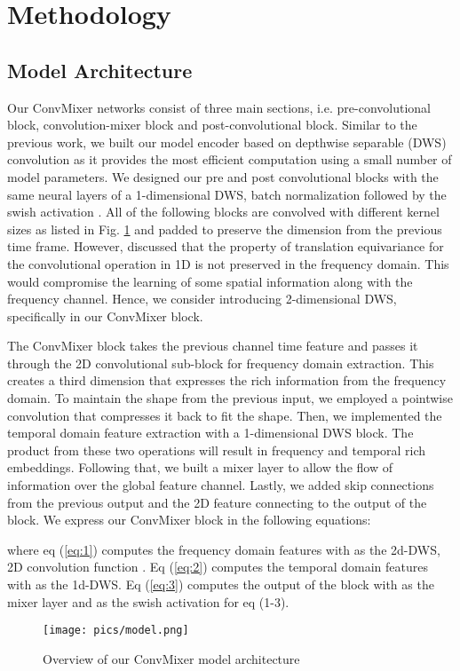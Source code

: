 \documentclass{article}
\begin{document}
\section{Methodology}
\label{sec:method}
\subsection{Model Architecture}
\label{ssec:model}
Our ConvMixer networks consist of three main sections, i.e. pre-convolutional block, convolution-mixer block and post-convolutional block. Similar to the previous work, we built our model encoder based on depthwise separable (DWS) convolution as it provides the most efficient computation using a small number of model parameters. We designed our pre and post convolutional blocks with the same neural layers of a 1-dimensional DWS, batch normalization followed by the swish activation \cite{ramachandran2017searching}. All of the following blocks are convolved with different kernel sizes as listed in Fig. \ref{fig:model} and padded to preserve the dimension from the previous time frame. However, \cite{kim2021broadcasted} discussed that the property of translation equivariance for the convolutional operation in 1D is not preserved in the frequency domain. This would compromise the learning of some spatial information along with the frequency channel. Hence, we consider introducing 2-dimensional DWS, specifically in our ConvMixer block. 

The ConvMixer block takes the previous channel  time feature and passes it through the 2D convolutional sub-block for frequency domain extraction. This creates a third dimension that expresses the rich information from the frequency domain. To maintain the shape from the previous input, we employed a pointwise convolution that compresses it back to fit the shape. Then, we implemented the temporal domain feature extraction with a 1-dimensional DWS block. The product from these two operations will result in frequency and temporal rich embeddings. Following that, we built a mixer layer to allow the flow of information over the global feature channel. Lastly, we added skip connections from the previous output and the 2D feature connecting to the output of the block. We express our ConvMixer block in the following equations: 

 where eq (\ref{eq:1}) computes the frequency domain features with  as the 2d-DWS, 2D convolution function . Eq (\ref{eq:2}) computes the temporal domain features with  as the 1d-DWS. Eq (\ref{eq:3}) computes the output of the block with  as the mixer layer and  as the swish activation for eq (1-3).
\begin{figure}[t]
    \centering
    \texttt{[image: pics/model.png]}
    \caption{Overview of our ConvMixer model architecture}
    \label{fig:model}
\end{figure}
\end{document}
